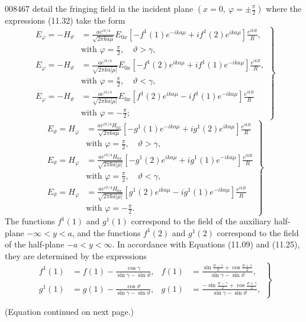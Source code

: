 \begin{scanpage}{0084}{67}
detail the fringing field in the incident plane $(x=0,\ \varphi=\pm\frac\pi2)$ where the expressions (11.32) take the form
\[
\left.\begin{aligned}
E_\varphi=-H_\vartheta&=\frac{ae^{i\pi/4}}{\sqrt{2\pi ka\mu}}E_{0x}[-f^1(1)e^{-ika\mu}+if^1(2)e^{ika\mu}]\frac{e^{ikR}}R,\\
&\text{with }\varphi=\frac\pi2,\quad\vartheta>\gamma,\\[4pt]
E_\varphi=-H_\vartheta&=\frac{ae^{i\pi/4}}{\sqrt{2\pi ka|\mu|}}E_{0x}[-f^1(2)e^{ika\mu}+if^1(1)e^{-ika\mu}]\frac{e^{ikR}}R,\\
&\text{with }\varphi=\frac\pi2,\quad\vartheta<\gamma,\\[4pt]
E_\varphi=-H_\vartheta&=\frac{ae^{i\pi/4}}{\sqrt{2\pi ka|\mu|}}E_{0x}[f^1(2)e^{ika\mu}-if^1(1)e^{-ika\mu}]\frac{e^{ikR}}R\\
&\text{with }\varphi=-\frac\pi2;
\end{aligned}\right\}\tag{12.01}
\]
\[
\left.\begin{aligned}
E_\vartheta=H_\varphi&=\frac{ae^{i\pi/4}H_{0x}}{\sqrt{2\pi ka\mu}}[-g^1(1)e^{-ika\mu}+ig^1(2)e^{ika\mu}]\frac{e^{ikR}}R\\
&\text{with }\varphi=\frac\pi2,\quad\vartheta>\gamma,\\[4pt]
E_\vartheta=H_\varphi&=\frac{ae^{i\pi/4}H_{0x}}{\sqrt{2\pi ka|\mu|}}[-g^1(2)e^{ika\mu}+ig^1(1)e^{-ika\mu}]\frac{e^{ikR}}R\\
&\text{with }\varphi=\frac\pi2,\quad\vartheta<\gamma,\\[4pt]
E_\vartheta=H_\varphi&=\frac{ae^{i\pi/4}H_{0x}}{\sqrt{2\pi ka|\mu|}}[g^1(2)e^{ika\mu}-ig^1(1)e^{-ika\mu}]\frac{e^{ikR}}R\\
&\text{with }\varphi=-\frac\pi2.
\end{aligned}\right\}\tag{12.02}
\]
The functions $f^1(1)$ and $g^1(1)$ correspond to the field of the auxiliary half-plane $-\infty<y<a$, and the functions $f^1(2)$ and $g^1(2)$ correspond to the field of the half-plane $-a<y<\infty$. In accordance with Equations (11.09) and (11.25), they are determined by the expressions
\[
\left.\begin{aligned}
f^1(1)&=f(1)-\frac{\cos\gamma}{\sin\gamma-\sin\vartheta},&
f(1)&=\frac{\sin\frac{\vartheta-\gamma}2+\cos\frac{\vartheta+\gamma}2}{\sin\gamma-\sin\vartheta},\\
g^1(1)&=g(1)-\frac{\cos\vartheta}{\sin\gamma-\sin\vartheta},&
g(1)&=\frac{-\sin\frac{\vartheta-\gamma}2+\cos\frac{\vartheta+\gamma}2}{\sin\gamma-\sin\vartheta},
\end{aligned}\right\}\tag{12.03}
\]
\begin{center}(Equation continued on next page.)\end{center}
\end{scanpage}
